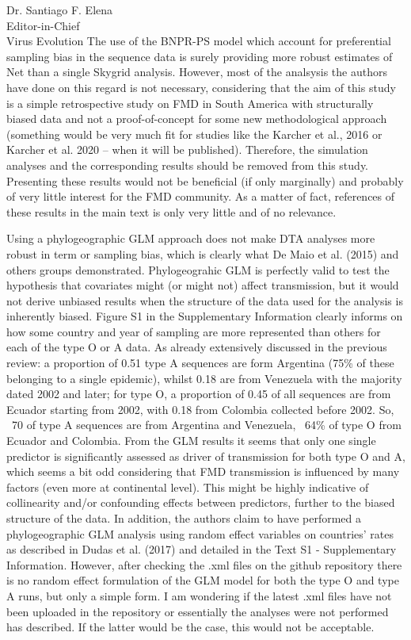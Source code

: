 \documentclass[12pt, a4paper]{letter} %
\begin{document}
\begin{letter}{
	Dr. Santiago F. Elena\\
    Editor-in-Chief \\
    Virus Evolution
}
The use of the BNPR-PS model which account for preferential sampling bias in the sequence data is surely providing more robust estimates of Net than a single Skygrid analysis.
However, most of the analsysis the authors have done on this regard is not necessary, considering that the aim of this study is a simple retrospective study on FMD in South America with structurally biased data and not a proof-of-concept for some new methodological approach (something would be very much fit for studies like the Karcher et al., 2016 or Karcher et al. 2020 – when it will be published).
Therefore, the simulation analyses and the corresponding results should be removed from this study. Presenting these results would not be beneficial (if only marginally) and probably of very little interest for the FMD community.
As a matter of fact, references of these results in the main text is only very little and of no relevance.

Using a phylogeographic GLM approach does not make DTA analyses more robust in term or sampling bias, which is clearly what De Maio et al. (2015) and others groups demonstrated.
Phylogeograhic GLM is perfectly valid to test the hypothesis that covariates might (or might not) affect transmission, but it would not derive unbiased results when the structure of the data used for the analysis is inherently biased.
Figure S1 in the Supplementary Information clearly informs on how some country and year of sampling are more represented than others for each of the type O or A data.
As already extensively discussed in the previous review: a proportion of 0.51 type A sequences are form Argentina (75\% of these belonging to a single epidemic), whilst 0.18 are from Venezuela with the majority dated 2002 and later; for type O, a proportion of 0.45 of all sequences are from Ecuador starting from 2002, with 0.18 from Colombia collected before 2002.
So, ~70 of type A sequences are from Argentina and Venezuela, ~64\% of type O from Ecuador and Colombia. From the GLM results it seems that only one single predictor is significantly assessed as driver of transmission for both type O and A, which seems a bit odd considering that FMD transmission is influenced by many factors (even more at continental level).
This might be highly indicative of collinearity and/or confounding effects between predictors, further to the biased structure of the data.
In addition, the authors claim to have performed a phylogeographic GLM analysis using random effect variables on countries’ rates as described in Dudas et al. (2017) and detailed in the Text S1 - Supplementary Information.
However, after checking the .xml files on the github repository there is no random effect formulation of the GLM model for both the type O and type A runs, but only a simple form.
I am wondering if the latest .xml files have not been uploaded in the repository or essentially the analyses were not performed has described.
If the latter would be the case, this would not be acceptable.


\end{letter}
\end{document}
